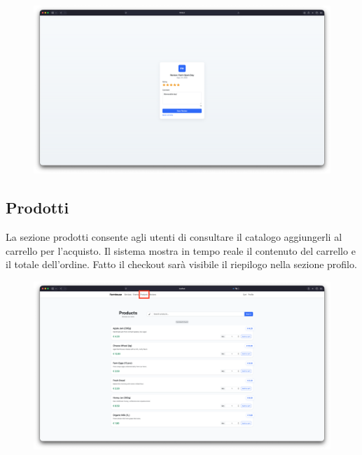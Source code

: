 \documentclass[a4paper,12pt]{report}
\begin{document}
\begin{figure}[H]
    \centering
    \includegraphics[width=\textwidth, trim=0 0 0 0]{./img/users/give_review.png}
    \vspace{-1em}
    \label{fig:lascia recensione}
\end{figure}

\subsection*{Prodotti}
La sezione prodotti consente agli utenti di consultare il catalogo aggiungerli al carrello per 
l'acquisto. Il sistema mostra in tempo reale il contenuto del carrello e il totale dell'ordine. 
Fatto il checkout sarà visibile il riepilogo nella sezione profilo.

\begin{figure}[H]
    \centering
    \includegraphics[width=\textwidth, trim=0 0 0 0]{./img/users/products.png}
    \vspace{-1em}
    \label{fig:products}
\end{figure}
\end{document}
